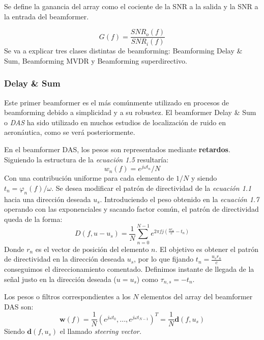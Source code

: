 \documentclass[a4paper,11pt]{book}
\begin{document}
		Se define la ganancia del array como el cociente de la SNR a la salida y la SNR a la entrada del beamformer.
		
		\begin{equation}
		G(f) = \frac{SNR_{o}(f)}{SNR_{i}(f)}
		\end{equation}
				Se va a explicar tres clases distintas de beamforming: Beamforming Delay \& Sum, Beamforming MVDR y Beamforming superdirectivo.
		\subsubsection{Delay \& Sum}
		Este primer beamformer es el más comúnmente utilizado en procesos de beamforming debido a simplicidad y a su robustez. El beamformer Delay \& Sum o \textit{DAS} ha sido utilizado en muchos estudios de localización de ruido en aeronáutica, como se verá posteriormente.
		
		En el beamformer DAS, los pesos son representados mediante \textbf{retardos}. Siguiendo la estructura de la \textit{ecuación 1.5} resultaría:
		\begin{equation}
		w_{n}(f) = e^{j \omega t_{n}} / N
		\end{equation}
		Con una contribución uniforme para cada elemento de $1/N$ y siendo $t_{n} = \varphi_{n}(f) / \omega$. Se desea modificar el patrón de directividad de la \textit{ecuación 1.1} hacia una dirección deseada $u_{s}$. Introduciendo el peso obtenido en la \textit{ecuación 1.7} operando con las exponenciales y sacando factor común, el patrón de directividad queda de la forma:
\begin{equation}
		D(f, u-u_{s}) = \frac{1}{N} \sum_{n = 0}^{N-1} e^{2\pi f j (\frac{u r_{n}}{c} - t_{n})}
		\end{equation}		
		Donde $r_{n}$ es el vector de posición del elemento $n$. El objetivo es obtener el patrón de directividad en la dirección deseada $u_{s}$, por lo que fijando $t_{n} = \frac{u_{s} r_{n}}{c}$ conseguimos el direccionamiento comentado. Definimos instante de llegada de la señal justo en la dirección deseada ($u = u_{s}$) como $\tau_{n,s} = -t_{n}$. 		
		
		Los pesos o filtros correspondientes a los $N$ elementos del array del beamformer DAS son:
		\begin{equation}
		\textbf{w}(f) = \frac{1}{N} (e^{j \omega t_{0}},...,e^{j \omega t_{N-1}})^{T} = \frac{1}{N} \textbf{d}(f,u_{s})
		\end{equation}
		Siendo $\textbf{d}(f,u_{s})$ el llamado \textit{steering vector.}
\end{document}
